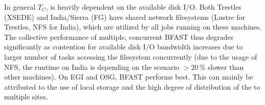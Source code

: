 \documentclass[conference]{IEEEtran}
\begin{document}


In general $T_{C}$, %
is heavily dependent on the available disk I/O. Both Trestles (XSEDE)
and India/Sierra (FG) have shared network filesystems (Lustre for
Trestles, NFS for India), which are utilized by all jobs running on
these machines. The collective performance of multiple, concurrent
BFAST \cu thus degrades significantly as contention for available disk
I/O bandwidth increases due to larger number of tasks accessing the
filesystem concurrently (due to the usage of NFS, the runtime on India
is depending on the scenario $>$20\,\% slower than other machines). On
EGI and OSG, BFAST \cu performs best. This can mainly be attributed to
the use of local storage and the high degree of distribution of the
\cus to multiple sites.





\end{document}
